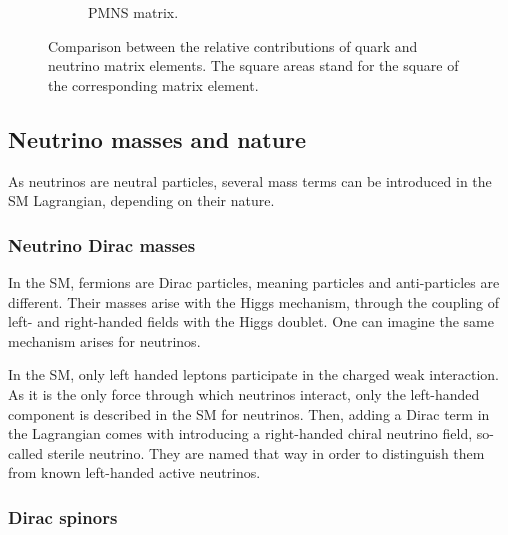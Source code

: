 \begin{figure}[h]
\begin{subfigure}[t]{0.48\textwidth}
    \captionsetup{justification=justified}
    \caption{PMNS matrix.
      \label{subfig:pmns}}
  \end{subfigure}
  \caption{Comparison between the relative contributions of quark and neutrino matrix elements.
    The square areas stand for the square of the corresponding matrix element.
    \label{fig:ckm_pmns}
  }
\end{figure}


\subsection{Neutrino masses and nature}


As neutrinos are neutral particles, several mass terms can be introduced in the SM Lagrangian, depending on their nature.

\subsubsection{Neutrino Dirac masses}
\label{subsec:dirac_mass}

In the SM, fermions are Dirac particles, meaning particles and anti-particles are different.
Their masses arise with the Higgs mechanism, through the coupling of left- and right-handed fields with the Higgs doublet.
One can imagine the same mechanism arises for neutrinos.

In the SM, only left handed leptons participate in the charged weak interaction.
As it is the only force through which neutrinos interact, only the left-handed component is described in the SM for neutrinos.
Then, adding a Dirac term in the Lagrangian comes with introducing a right-handed chiral neutrino field, so-called sterile neutrino.
They are named that way in order to distinguish them from known left-handed active neutrinos.

\subsubsection*{Dirac spinors}

